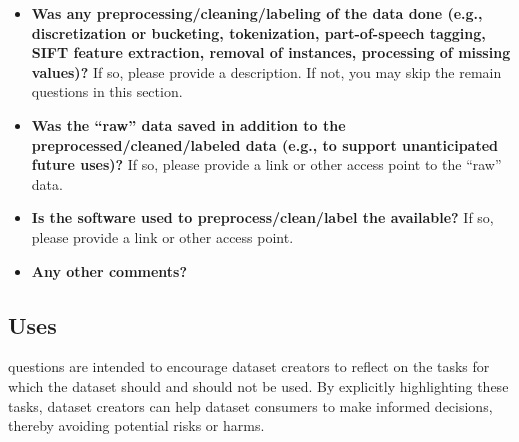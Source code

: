 \begin{itemize}

\item \textbf{Was any preprocessing/cleaning/labeling of the data done
    (e.g., discretization or bucketing, tokenization, part-of-speech
    tagging, SIFT feature extraction, removal of instances, processing
    of missing values)?} If so, please provide a description. If not,
  you may skip the remain questions in this section.

\item \textbf{Was the ``raw'' data saved in addition to the preprocessed/cleaned/labeled data (e.g., to support unanticipated future uses)?} If so, please provide a link or other access point to the ``raw'' data.

\item \textbf{Is the software  used to preprocess/clean/label the  available?} If so, please provide a link or other access point.

\item \textbf{Any other comments?}

\end{itemize}

\subsection{Uses}

 questions  are intended to encourage dataset
creators to reflect on the tasks for which the dataset should and
should not be used. By explicitly highlighting these tasks, dataset
creators can help dataset consumers to make informed decisions,
thereby avoiding potential risks or harms.\\

